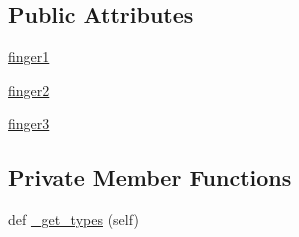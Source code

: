 \subsection*{Public Attributes}
\begin{DoxyCompactItemize}
\item 
\hyperlink{classjaco__msgs_1_1msg_1_1__FingerPosition_1_1FingerPosition_a430ef099e85b82ce1a61235bd0496ff5}{finger1}
\item 
\hyperlink{classjaco__msgs_1_1msg_1_1__FingerPosition_1_1FingerPosition_a1d275302f5906a117122394553b0d533}{finger2}
\item 
\hyperlink{classjaco__msgs_1_1msg_1_1__FingerPosition_1_1FingerPosition_ae22eef5355a658212ddb6b748780e72f}{finger3}
\end{DoxyCompactItemize}
\subsection*{Private Member Functions}
\begin{DoxyCompactItemize}
\item 
def \hyperlink{classjaco__msgs_1_1msg_1_1__FingerPosition_1_1FingerPosition_a98283be4a3cec4807383b51d051fc0c5}{\+\_\+get\+\_\+types} (self)
\end{DoxyCompactItemize}
